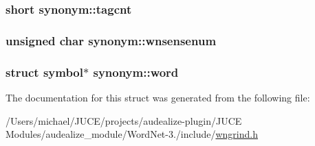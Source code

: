\subsubsection[{\texorpdfstring{tagcnt}{tagcnt}}]{\setlength{\rightskip}{0pt plus 5cm}short synonym\+::tagcnt}\hypertarget{structsynonym_aa8d3b5cfe5c1655dd17dbeb33c5a32ee}{}\label{structsynonym_aa8d3b5cfe5c1655dd17dbeb33c5a32ee}
\subsubsection[{\texorpdfstring{wnsensenum}{wnsensenum}}]{\setlength{\rightskip}{0pt plus 5cm}unsigned char synonym\+::wnsensenum}\hypertarget{structsynonym_a5c9bd36f2044cf3efe20bdc80047fa87}{}\label{structsynonym_a5c9bd36f2044cf3efe20bdc80047fa87}
\subsubsection[{\texorpdfstring{word}{word}}]{\setlength{\rightskip}{0pt plus 5cm}struct {\bf symbol}$\ast$ synonym\+::word}\hypertarget{structsynonym_a76fb3a2c037b88010fd0f402ca48f1e2}{}\label{structsynonym_a76fb3a2c037b88010fd0f402ca48f1e2}


The documentation for this struct was generated from the following file\+:\begin{DoxyCompactItemize}
\item 
/\+Users/michael/\+J\+U\+C\+E/projects/audealize-\/plugin/\+J\+U\+C\+E Modules/audealize\+\_\+module/\+Word\+Net-\/3./include/\hyperlink{wngrind_8h}{wngrind.\+h}\end{DoxyCompactItemize}
